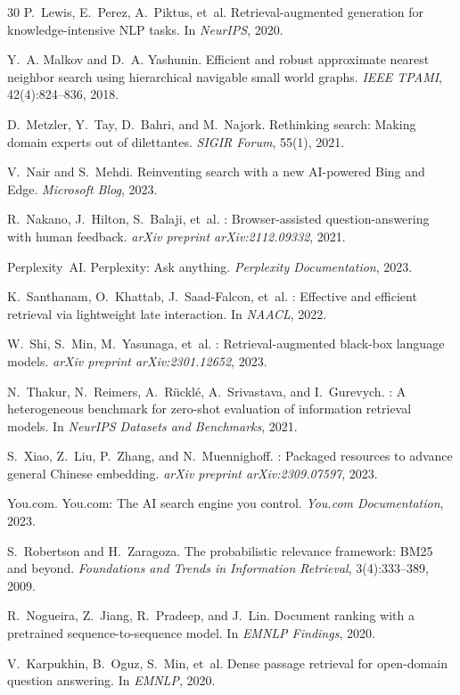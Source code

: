 \begin{thebibliography}{30}
P.~Lewis, E.~Perez, A.~Piktus, et~al.
\newblock Retrieval-augmented generation for knowledge-intensive {NLP} tasks.
\newblock In \emph{NeurIPS}, 2020.

Y.~A. Malkov and D.~A. Yashunin.
\newblock Efficient and robust approximate nearest neighbor search using hierarchical navigable small world graphs.
\newblock \emph{IEEE TPAMI}, 42(4):824--836, 2018.

D.~Metzler, Y.~Tay, D.~Bahri, and M.~Najork.
\newblock Rethinking search: Making domain experts out of dilettantes.
\newblock \emph{SIGIR Forum}, 55(1), 2021.

V.~Nair and S.~Mehdi.
\newblock Reinventing search with a new {AI}-powered {Bing} and {Edge}.
\newblock \emph{Microsoft Blog}, 2023.

R.~Nakano, J.~Hilton, S.~Balaji, et~al.
: Browser-assisted question-answering with human feedback.
\newblock \emph{arXiv preprint arXiv:2112.09332}, 2021.

Perplexity~AI.
\newblock Perplexity: Ask anything.
\newblock \emph{Perplexity Documentation}, 2023.

K.~Santhanam, O.~Khattab, J.~Saad-Falcon, et~al.
: Effective and efficient retrieval via lightweight late interaction.
\newblock In \emph{NAACL}, 2022.

W.~Shi, S.~Min, M.~Yasunaga, et~al.
: Retrieval-augmented black-box language models.
\newblock \emph{arXiv preprint arXiv:2301.12652}, 2023.

N.~Thakur, N.~Reimers, A.~R\"uckl\'e, A.~Srivastava, and I.~Gurevych.
: A heterogeneous benchmark for zero-shot evaluation of information retrieval models.
\newblock In \emph{NeurIPS Datasets and Benchmarks}, 2021.

S.~Xiao, Z.~Liu, P.~Zhang, and N.~Muennighoff.
: Packaged resources to advance general {Chinese} embedding.
\newblock \emph{arXiv preprint arXiv:2309.07597}, 2023.

You.com.
\newblock You.com: The {AI} search engine you control.
\newblock \emph{You.com Documentation}, 2023.

S.~Robertson and H.~Zaragoza.
\newblock The probabilistic relevance framework: {BM25} and beyond.
\newblock \emph{Foundations and Trends in Information Retrieval}, 3(4):333--389, 2009.

R.~Nogueira, Z.~Jiang, R.~Pradeep, and J.~Lin.
\newblock Document ranking with a pretrained sequence-to-sequence model.
\newblock In \emph{EMNLP Findings}, 2020.

V.~Karpukhin, B.~Oguz, S.~Min, et~al.
\newblock Dense passage retrieval for open-domain question answering.
\newblock In \emph{EMNLP}, 2020.

\end{thebibliography}

